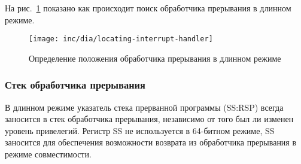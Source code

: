 На рис.~\ref{fig:locating_interrupt_handler} показано как происходит поиск
обработчика прерывания в длинном режиме.

\begin{figure}[ht!]
  \centering
  \texttt{[image: inc/dia/locating-interrupt-handler]}
  \caption{Определение положения обработчика прерывания в длинном режиме}
  \label{fig:locating_interrupt_handler}
\end{figure}


\subsubsection*{Стек обработчика прерывания}
В длинном режиме указатель стека прерванной программы (SS:RSP) всегда заносится в
стек обработчика прерывания, независимо от того был ли изменен уровень
привелегий. Регистр SS не используется в 64-битном режиме, SS заносится для
обеспечения возможности возврата из обработчика прерывания в режиме
совместимости.

